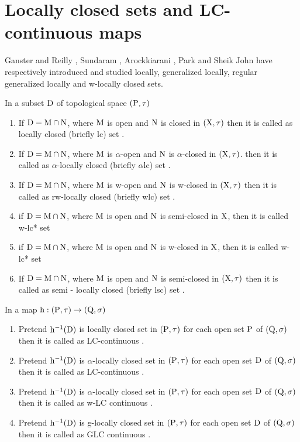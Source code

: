 \section{Locally closed sets and LC-continuous maps}

Ganster and Reilly \cite{Ganster}, Sundaram \cite{Sundaram}, Arockkiarani \cite{Arockiarani}, Park \cite{Park} and Sheik John \cite{Sheik1} have respectively introduced and studied locally, generalized locally, regular generalized locally and w-locally closed sets. 

\begin{dfn}\label{dfn1.5.1}
In a subset $\mathrm{D}$ of topological space $(\mathrm{P}, \tau)$ 
\begin{enumerate}[\rm (i)]
\item If $\mathrm{D}=\mathrm{M} \cap \mathrm{N}$, where $\mathrm{M}$ is open and $\mathrm{N}$ is closed in $(\mathrm{X},\tau)$ then it is called as locally closed (briefly lc) set \cite{Reilly1}. 
\item If $\mathrm{D}=\mathrm{M} \cap \mathrm{N}$, where $\mathrm{M}$ is $\alpha$-open and $\mathrm{N}$ is $\alpha$-closed in $(\mathrm{X}, \tau)$. then it is called as $\alpha$-locally closed (briefly $\alpha$lc) set \cite{Njastad}.
\item If $\mathrm{D}=\mathrm{M} \cap \mathrm{N}$, where $\mathrm{M}$ is w-open and $\mathrm{N}$ is w-closed in $(\mathrm{X}, \tau)$ then it is called as rw-locally closed (briefly wlc) set \cite{Sheik1}.
\item \cite{Sheik1} if $\mathrm{D}=\mathrm{M} \cap \mathrm{N}$, where $\mathrm{M}$ is open and $\mathrm{N}$ is semi-closed in $\mathrm{X}$, then it is called w-lc* set
\item \cite{Sheik1} if $\mathrm{D}=\mathrm{M} \cap \mathrm{N}$, where $\mathrm{M}$ is open and $\mathrm{N}$ is w-closed in $\mathrm{X}$, then it is called w-lc* set
\item If $\mathrm{D}=\mathrm{M}\cap \mathrm{N}$, where $\mathrm{M}$ is open and $\mathrm{N}$ is semi-closed in $(\mathrm{X}, \tau)$ then it is called as semi - locally closed (briefly lsc) set \cite{Balachandran}.
\end{enumerate}
\end{dfn}

\begin{dfn}\label{dfn1.5.2} 
In a map $\mathrm{h}: (\mathrm{P}, \tau) \rightarrow (\mathrm{Q}, \sigma)$ 
\begin{enumerate}[\rm (i)]
\item Pretend $\mathrm{h}^{-1}(\mathrm{D})$ is locally closed set in $(\mathrm{P}, \tau)$ for each open set $\mathrm{P}$ of $(\mathrm{Q}, \sigma)$ then it is called as LC-continuous \cite{Reilly1}.
\item Pretend $\mathrm{h}^{-1}(\mathrm{D})$ is $\alpha$-locally closed set in $(\mathrm{P}, \tau)$ for each open set $\mathrm{D}$ of $(\mathrm{Q}, \sigma)$ then it is called as LC-continuous \cite{Njastad}.
\item Pretend $\mathrm{h}^{-1}(\mathrm{D})$ is $\alpha$-locally closed set in $(\mathrm{P},\tau)$ for each open set $\mathrm{D}$ of $(\mathrm{Q}, \sigma)$ then it is called as w-LC continuous \cite{Sheik}.
\item Pretend $\mathrm{h}^{-1}(\mathrm{D})$ is g-locally closed set in $(\mathrm{P},\tau)$ for each open set $\mathrm{D}$ of $(\mathrm{Q}, \sigma)$ then it is called as GLC continuous \cite{Balachandran}.
\end{enumerate}
\end{dfn}

